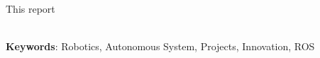 \begin{thesisabastract}
This report 

\ \\


\textbf{Keywords}: Robotics, Autonomous System, Projects, Innovation, ROS

\end{thesisabastract}
